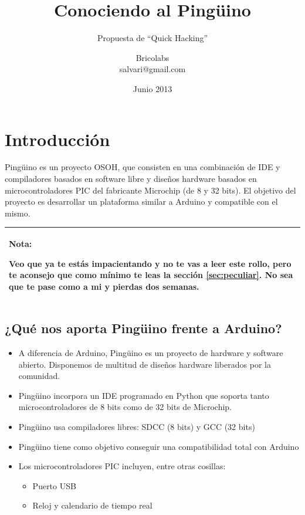 \documentclass[12pt,a4paper,twoside,DIV=15]{scrartcl}
\title{Conociendo al Pingüino}
\subtitle{Propuesta de ``Quick Hacking''}
\author{Bricolabs\\
  \small salvari@gmail.com\\
}
\date{\small Junio 2013}
\newenvironment{nota}%
{%
\begin{table}[h]\centering
\begin{tabular}{ |p{12cm}|}%
\hline%
\textbf{Nota:}%
}%
{%
\hline%
\end{tabular}%
\end{table}
}
\begin{document}
\maketitle


\tableofcontents
\section{Introducción}
\label{sec:introduccion}

Pingüino es un proyecto OSOH, que consisten en una combinación de IDE
y compiladores basados en software libre y diseños hardware basados en
microcontroladores PIC del fabricante Microchip (de 8 y 32 bits). El
objetivo del proyecto es desarrollar un plataforma similar a Arduino y
compatible con el mismo.

\begin{nota}
  Veo que ya te estás impacientando y no te vas a leer este rollo,
  pero te aconsejo que como mínimo te leas la sección
  \ref{sec:peculiar}. No sea que te pase como a mi y pierdas dos
  semanas.\\
\end{nota}

\subsection{¿Qué nos aporta Pingüino frente a Arduino?}
\label{sec:ventajas}

\begin{itemize}
\item A diferencia de Arduino, Pingüino es un proyecto de hardware y
  software abierto. Disponemos de multitud de diseños hardware
  liberados por la comunidad.
\item Pingüino incorpora un IDE programado en Python que soporta tanto
  microcontroladores de 8 bits como de 32 bits de Microchip.
\item Pingüino usa compiladores libres: SDCC (8 bits)  y GCC (32 bits)
\item Pingüino tiene como objetivo conseguir una compatibilidad total con Arduino
\item Los microcontroladores PIC incluyen, entre otras cosillas:
  \begin{itemize}
  \item Puerto USB
  \item Reloj y calendario de tiempo real
  \end{itemize}
\end{itemize}
\end{document}
